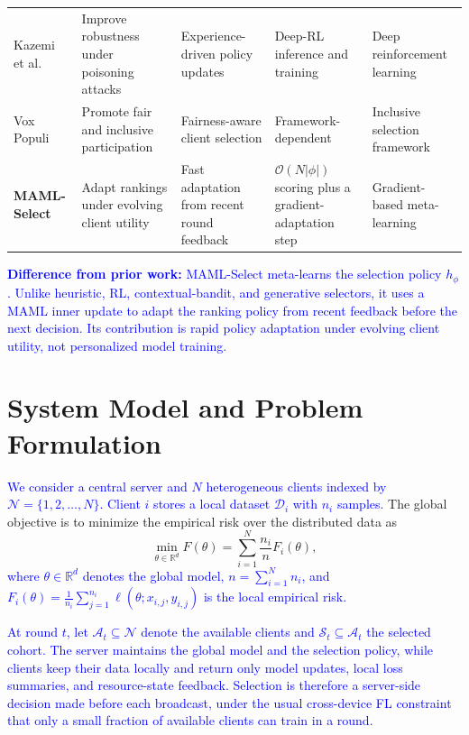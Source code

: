 \documentclass[journal]{IEEEtran}
\newcommand{\revision}[1]{\textcolor{blue}{#1}}
\begin{document}
\begin{table}[!t]
\begin{tabularx}{\textwidth}{lXXXX}
        Kazemi et al.~\cite{kazemi2026robust} & Improve robustness under poisoning attacks & Experience-driven policy updates & Deep-RL inference and training & Deep reinforcement learning \\
        Vox Populi~\cite{arisdakessian2026vox} & Promote fair and inclusive participation & Fairness-aware client selection & Framework-dependent & Inclusive selection framework \\
        \textbf{MAML-Select} & Adapt rankings under evolving client utility & Fast adaptation from recent round feedback & $\mathcal{O}(N|\phi|)$ scoring plus a gradient-adaptation step & Gradient-based meta-learning \\
        \bottomrule
    \end{tabularx}
\end{table}

\revision{\textbf{Difference from prior work:} MAML-Select meta-learns the selection policy $h_\phi$. Unlike heuristic, RL, contextual-bandit, and generative selectors, it uses a MAML inner update to adapt the ranking policy from recent feedback before the next decision. Its contribution is rapid policy adaptation under evolving client utility, not personalized model training.}

\section{System Model and Problem Formulation}
\revision{We consider a central server and $N$ heterogeneous clients indexed by $\mathcal{N} = \{1, 2, \ldots, N\}$. Client $i$ stores a local dataset $\mathcal{D}_i$ with $n_i$ samples.} The global objective is to minimize the empirical risk over the distributed data as
\begin{equation}
	\min_{\theta \in \mathbb{R}^d} F(\theta) = \sum_{i=1}^{N} \frac{n_i}{n} F_i(\theta),
	\label{eq:global_objective}
\end{equation}
\revision{where $\theta \in \mathbb{R}^d$ denotes the global model, $n = \sum_{i=1}^{N} n_i$, and $F_i(\theta) = \frac{1}{n_i} \sum_{j=1}^{n_i} \ell(\theta; x_{i,j}, y_{i,j})$ is the local empirical risk.}

\revision{At round $t$, let $\mathcal{A}_t \subseteq \mathcal{N}$ denote the available clients and $\mathcal{S}_t \subseteq \mathcal{A}_t$ the selected cohort. The server maintains the global model and the selection policy, while clients keep their data locally and return only model updates, local loss summaries, and resource-state feedback. Selection is therefore a server-side decision made before each broadcast, under the usual cross-device FL constraint that only a small fraction of available clients can train in a round.}
\end{document}
